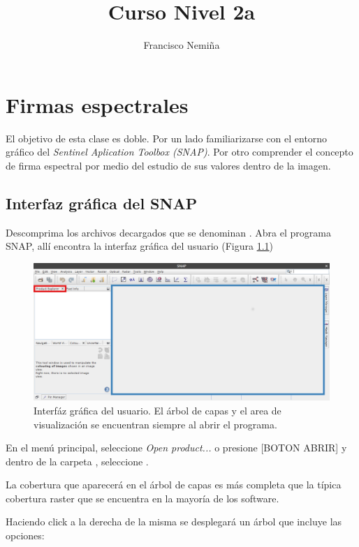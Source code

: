 \documentclass[a4paper,12pt]{book}
\title{Curso Nivel 2a}
\author{Francisco Nemiña}
\begin{document}
\maketitle
\titlepage
\chapter{Firmas espectrales}
El objetivo de esta clase es doble. Por un lado familiarizarse con el entorno gráfico del \emph{Sentinel Aplication Toolbox (SNAP)}. Por otro comprender el concepto de firma espectral por medio del estudio de sus valores dentro de la imagen.

\section{Interfaz gráfica del SNAP}

Descomprima los archivos decargados que se denominan . Abra el programa SNAP, allí encontra la interfaz gráfica del usuario (Figura \ref{fig:int})

\begin{figure}[h]
    \centering
    \includegraphics{fig:int.png}
    \caption{Interfáz gráfica del usuario. El árbol de capas y el area de visualización se encuentran siempre al abrir el programa.}
    \label{fig:int}
\end{figure}

En el menú principal, seleccione \emph{Open product...} o presione [BOTON ABRIR] y dentro de la carpeta , seleccione .

La cobertura que aparecerá en el árbol de capas es más completa que la típica cobertura raster que se encuentra en la mayoría de los software.

Haciendo click a la derecha de la misma se desplegará un árbol que incluye las opciones:
\end{document}
